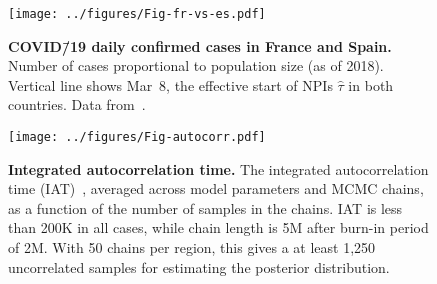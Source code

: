 \documentclass[12pt]{extarticle}
\newcommand{\covid}{COVID\=/19 }
\begin{document}
\begin{figure}[h]
    \centering
	\texttt{[image: ../figures/Fig-fr-vs-es.pdf]}
    \caption{
    \textbf{\covid daily confirmed cases in France and Spain.}
    Number of cases proportional to population size (as of 2018). 
    Vertical line shows Mar~8, the effective start of NPIs $\hat{\tau}$ in both countries.
    Data from~\citet{Flaxman2020}.
    } 
    \label{fig:fig-fr-vs-es}
\end{figure}



\begin{figure}[h]
    \centering
	\texttt{[image: ../figures/Fig-autocorr.pdf]}
    \caption{
    \textbf{Integrated autocorrelation time.}
    The integrated autocorrelation time (IAT)~\citep{Foreman-Mackey2013,Goodman2010}, averaged across model parameters and MCMC chains, as a function of the number of samples in the chains.
    IAT is less than 200K in all cases, while chain length is 5M after burn-in period of 2M. With 50 chains per region, this gives a at least 1,250 uncorrelated samples for estimating the posterior distribution.
    } 
    \label{fig:autocorr}
\end{figure}
\end{document}
